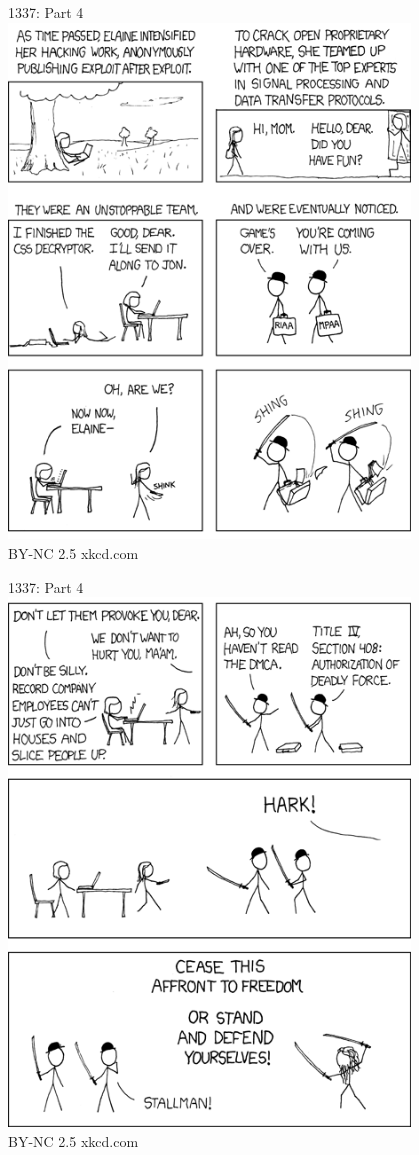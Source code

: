 \documentclass[a6paper,fontsize=10pt,twoside,open=right]{scrbook}
\begin{document}
\begin{center}
  \tiny{1337: Part 4}\\
  \includegraphics[keepaspectratio,width=0.8\textwidth]{elements/images/1337_part_4_1.png}\\
  \tiny{BY-NC 2.5 xkcd.com}
\end{center}\par
\vspace{10pt}
\vfill
\newpage
\null
\vfill
\begin{center}
  \tiny{1337: Part 4}\\
  \includegraphics[keepaspectratio,width=0.8\textwidth]{elements/images/1337_part_4_2.png}\\
  \tiny{BY-NC 2.5 xkcd.com}
\end{center}\par
\end{document}
